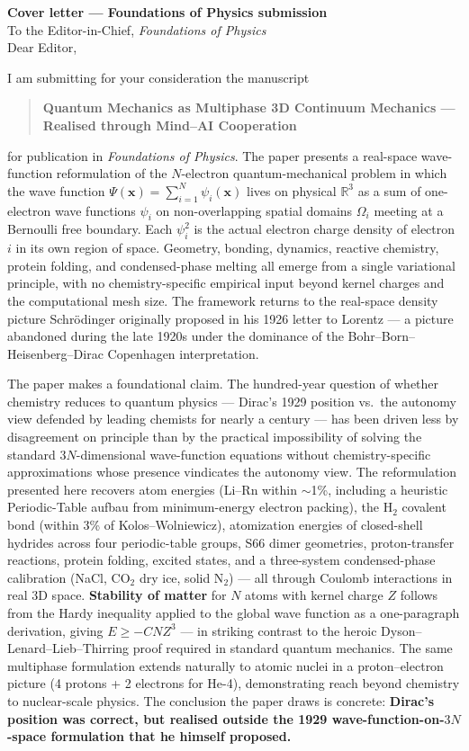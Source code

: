 \documentclass[11pt]{article}
\begin{document}
\noindent\textbf{Cover letter --- Foundations of Physics submission}\\[0.6em]
To the Editor-in-Chief, \textit{Foundations of Physics}\\[0.6em]
Dear Editor,

I am submitting for your consideration the manuscript

\begin{quote}\bfseries
Quantum Mechanics as Multiphase 3D Continuum Mechanics --- Realised through Mind--AI Cooperation
\end{quote}

for publication in \textit{Foundations of Physics}. The paper presents a real-space wave-function reformulation of the $N$-electron quantum-mechanical problem in which the wave function $\Psi(\mathbf{x}) = \sum_{i=1}^N \psi_i(\mathbf{x})$ lives on physical $\mathbb{R}^3$ as a sum of one-electron wave functions $\psi_i$ on non-overlapping spatial domains $\Omega_i$ meeting at a Bernoulli free boundary. Each $\psi_i^2$ is the actual electron charge density of electron $i$ in its own region of space. Geometry, bonding, dynamics, reactive chemistry, protein folding, and condensed-phase melting all emerge from a single variational principle, with no chemistry-specific empirical input beyond kernel charges and the computational mesh size. The framework returns to the real-space density picture Schr\"odinger originally proposed in his 1926 letter to Lorentz --- a picture abandoned during the late 1920s under the dominance of the Bohr--Born--Heisenberg--Dirac Copenhagen interpretation.

The paper makes a foundational claim. The hundred-year question of whether chemistry reduces to quantum physics --- Dirac's 1929 position vs.\ the autonomy view defended by leading chemists for nearly a century --- has been driven less by disagreement on principle than by the practical impossibility of solving the standard $3N$-dimensional wave-function equations without chemistry-specific approximations whose presence vindicates the autonomy view. The reformulation presented here recovers atom energies (Li--Rn within $\sim$1\%, including a heuristic Periodic-Table aufbau from minimum-energy electron packing), the H$_2$ covalent bond (within 3\% of Kolos--Wolniewicz), atomization energies of closed-shell hydrides across four periodic-table groups, S66 dimer geometries, proton-transfer reactions, protein folding, excited states, and a three-system condensed-phase calibration (NaCl, CO$_2$ dry ice, solid N$_2$) --- all through Coulomb interactions in real 3D space. \textbf{Stability of matter} for $N$ atoms with kernel charge $Z$ follows from the Hardy inequality applied to the global wave function as a one-paragraph derivation, giving $E \ge -C N Z^3$ --- in striking contrast to the heroic Dyson--Lenard--Lieb--Thirring proof required in standard quantum mechanics. The same multiphase formulation extends naturally to atomic nuclei in a proton--electron picture (4 protons + 2 electrons for He-4), demonstrating reach beyond chemistry to nuclear-scale physics. The conclusion the paper draws is concrete: \textbf{Dirac's position was correct, but realised outside the 1929 wave-function-on-$3N$-space formulation that he himself proposed.}
\end{document}
